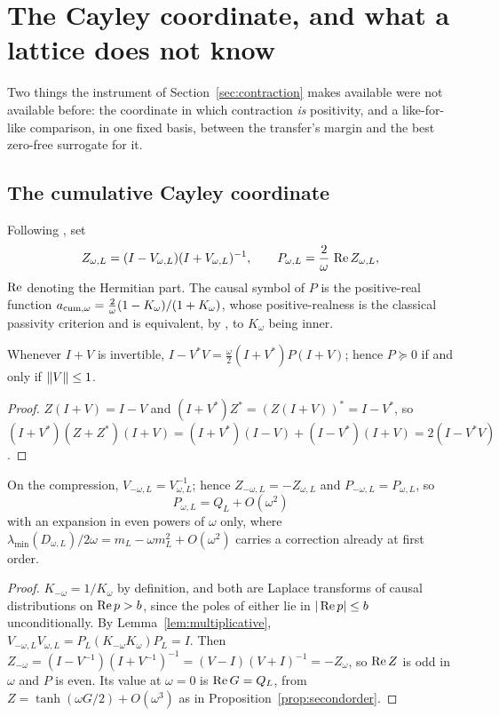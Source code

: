 \section{The Cayley coordinate, and what a lattice does not know}\label{sec:cayley}

Two things the instrument of Section~\ref{sec:contraction} makes available were
not available before: the coordinate in which contraction \emph{is} positivity,
and a like-for-like comparison, in one fixed basis, between the transfer's
margin and the best zero-free surrogate for it.

\subsection{The cumulative Cayley coordinate}\label{sec:cayleycoord}

Following \cite[Proposition~7.7]{WilsonLines}, set
\begin{equation}\label{eq:cayley}
 Z_{\omega,L}=(I-V_{\omega,L})(I+V_{\omega,L})^{-1},\qquad
 P_{\omega,L}=\frac2\omega\,\operatorname{Re} Z_{\omega,L},
\end{equation}
$\operatorname{Re}$ denoting the Hermitian part. The causal symbol of $P$ is the positive-real
function $a_{\rm cum,\omega}=\frac2\omega(1-K_\omega)/(1+K_\omega)$, whose
positive-realness is the classical passivity criterion and is equivalent, by
\cite[Proposition~7.8]{WilsonLines}, to $K_\omega$ being inner.

\begin{proposition}\label{prop:congruence}
Whenever $I+V$ is invertible, $I-V^*V=\frac\omega2(I+V^*)P(I+V)$; hence
$P\succeq0$ if and only if $\lVert V\rVert\leq1$.
\end{proposition}
\begin{proof}
$Z(I+V)=I-V$ and $(I+V^*)Z^*=(Z(I+V))^*=I-V^*$, so
$(I+V^*)(Z+Z^*)(I+V)=(I+V^*)(I-V)+(I-V^*)(I+V)=2(I-V^*V)$.
\end{proof}

\begin{proposition}\label{prop:evencayley}
On the compression, $V_{-\omega,L}=V_{\omega,L}^{-1}$; hence
$Z_{-\omega,L}=-Z_{\omega,L}$ and $P_{-\omega,L}=P_{\omega,L}$, so
\begin{equation}\label{eq:Pexpansion}
 P_{\omega,L}=Q_L+O(\omega^2)
\end{equation}
with an expansion in even powers of $\omega$ only, where
$\lambda_{\min}(D_{\omega,L})/2\omega=m_L-\omega m_L^2+O(\omega^2)$ carries a
correction already at first order.
\end{proposition}
\begin{proof}
$K_{-\omega}=1/K_\omega$ by definition, and both are Laplace transforms of
causal distributions on $\operatorname{Re} p>b$, since the poles of either lie in
$|\operatorname{Re} p|\leq b$ unconditionally. By Lemma~\ref{lem:multiplicative},
$V_{-\omega,L}V_{\omega,L}=P_L(K_{-\omega}K_\omega)P_L=I$. Then
$Z_{-\omega}=(I-V^{-1})(I+V^{-1})^{-1}=(V-I)(V+I)^{-1}=-Z_\omega$, so $\operatorname{Re} Z$ is
odd in $\omega$ and $P$ is even. Its value at $\omega=0$ is $\operatorname{Re} G=Q_L$, from
$Z=\tanh(\omega G/2)+O(\omega^3)$ as in
Proposition~\ref{prop:secondorder}.
\end{proof}

